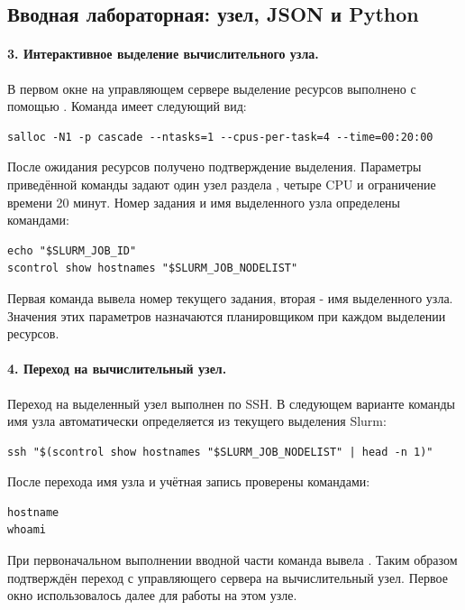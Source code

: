 \documentclass[14pt,a4paper]{extarticle}
\newcommand{\code}[1]{\texttt{\detokenize{#1}}}
\begin{document}
\subsection{Вводная лабораторная: узел, JSON и Python}
\paragraph{3. Интерактивное выделение вычислительного узла.}
В первом окне на управляющем сервере выделение ресурсов выполнено с помощью \code{salloc}. Команда имеет следующий вид:
\par\noindent\begin{minipage}{\linewidth}
\begin{lstlisting}
salloc -N1 -p cascade --ntasks=1 --cpus-per-task=4 --time=00:20:00
\end{lstlisting}
\end{minipage}\par
После ожидания ресурсов получено подтверждение выделения. Параметры приведённой команды задают один узел раздела \code{cascade}, четыре CPU и ограничение времени 20 минут. Номер задания и имя выделенного узла определены командами:
\par\noindent\begin{minipage}{\linewidth}
\begin{lstlisting}
echo "$SLURM_JOB_ID"
scontrol show hostnames "$SLURM_JOB_NODELIST"
\end{lstlisting}
\end{minipage}\par
Первая команда вывела номер текущего задания, вторая - имя выделенного узла. Значения этих параметров назначаются планировщиком при каждом выделении ресурсов.

\paragraph{4. Переход на вычислительный узел.}
Переход на выделенный узел выполнен по SSH. В следующем варианте команды имя узла автоматически определяется из текущего выделения Slurm:
\par\noindent\begin{minipage}{\linewidth}
\begin{lstlisting}
ssh "$(scontrol show hostnames "$SLURM_JOB_NODELIST" | head -n 1)"
\end{lstlisting}
\end{minipage}\par
После перехода имя узла и учётная запись проверены командами:
\par\noindent\begin{minipage}{\linewidth}
\begin{lstlisting}
hostname
whoami
\end{lstlisting}
\end{minipage}\par
При первоначальном выполнении вводной части команда \code{hostname} вывела \code{n06p049}. Таким образом подтверждён переход с управляющего сервера на вычислительный узел. Первое окно использовалось далее для работы на этом узле.
\end{document}

